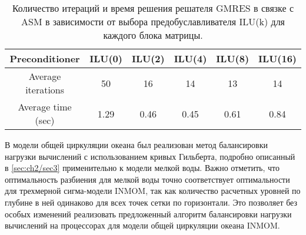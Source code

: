 \bigskip

\begin{table}[htb!]
\caption{Количество итераций и время решения решателя GMRES в связке с ASM в зависимости от выбора предобуславливателя ILU(k) для каждого блока матрицы.}
\begin{tabular}{|c|c|c|c|c|c|}
\hline 
Preconditioner & ILU(0) & ILU(2) & ILU(4) & ILU(8) & ILU(16) \\ 
\hline 
Average iterations & 50 & 16 & 14 & 13 & 14 \\ 
\hline 
Average time (sec) & 1.29 & 0.46 & 0.45 & 0.61 & 0.84 \\ 
\hline 
\end{tabular} 
\end{table}



	В модели общей циркуляции океана был реализован метод балансировки нагрузки вычислений с использованием кривых Гильберта, подробно описанный в \ref{sec:ch2/sec3} применительно к модели мелкой воды. Важно отметить, что оптимальность разбиения для мелкой воды точно соответствует оптимальности для трехмерной сигма-модели INMOM, так как количество расчетных уровней по глубине в ней одинаково для всех точек сетки по горизонтали. Это позволяет без особых изменений реализовать предложенный алгоритм балансировки нагрузки вычислений на процессорах для модели общей циркуляции океана INMOM.
	
\FloatBarrier
